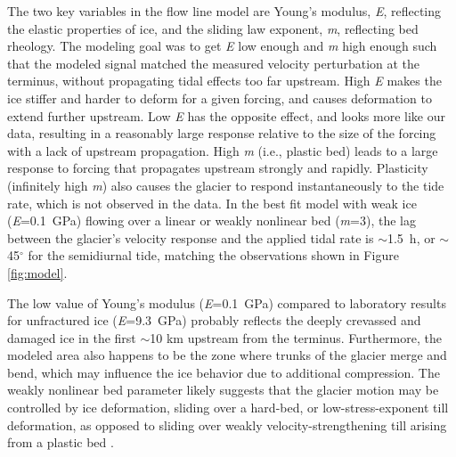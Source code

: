 \documentclass[review]{igs}
\begin{document}
The two key variables  in the flow line model are Young’s modulus, \textit{E}, reflecting the elastic properties of ice, and the sliding law exponent, \textit{m}, reflecting bed rheology. The modeling goal was to get \textit{E} low enough and \textit{m} high enough such that the modeled signal matched the measured velocity perturbation at the terminus, without propagating tidal effects too far upstream. High \textit{E} makes the ice stiffer and harder to deform for a given forcing, and causes deformation to extend further upstream. Low \textit{E} has the opposite effect, and looks more like our data, resulting in a reasonably large response relative to the size of the forcing with a lack of upstream propagation. High \textit{m} (i.e., plastic bed) leads to a large response to forcing that propagates upstream strongly and rapidly. Plasticity (infinitely high \textit{m}) also causes the glacier to respond instantaneously to the tide rate, which is not observed in the data. In the best fit model with weak ice (\textit{E}=0.1~GPa) flowing over a linear or weakly nonlinear bed (\textit{m}=3), the lag between the glacier's velocity response and the applied tidal rate is $\sim$1.5~h, or $\sim$45$^{\circ}$ for the semidiurnal tide, matching the observations shown in Figure \ref{fig:model}. 


The low value of Young’s modulus (\textit{E}=0.1~GPa) compared to laboratory results for unfractured ice (\textit{E}=9.3~GPa) \citep{reeh2003tidal}
probably reflects the deeply crevassed and damaged ice in the first $\sim$10 km upstream from the terminus. Furthermore, the modeled area also happens to be the zone where trunks of the glacier merge and bend, which may influence the ice behavior due to additional compression. The weakly nonlinear bed parameter likely suggests that the glacier motion may be controlled by ice deformation, sliding over a hard-bed, or low-stress-exponent till deformation, as opposed to sliding over weakly velocity-strengthening till arising from a plastic bed \citep{licciardi1998deglaciation,walker2012viscoelastic}. 
\end{document}

